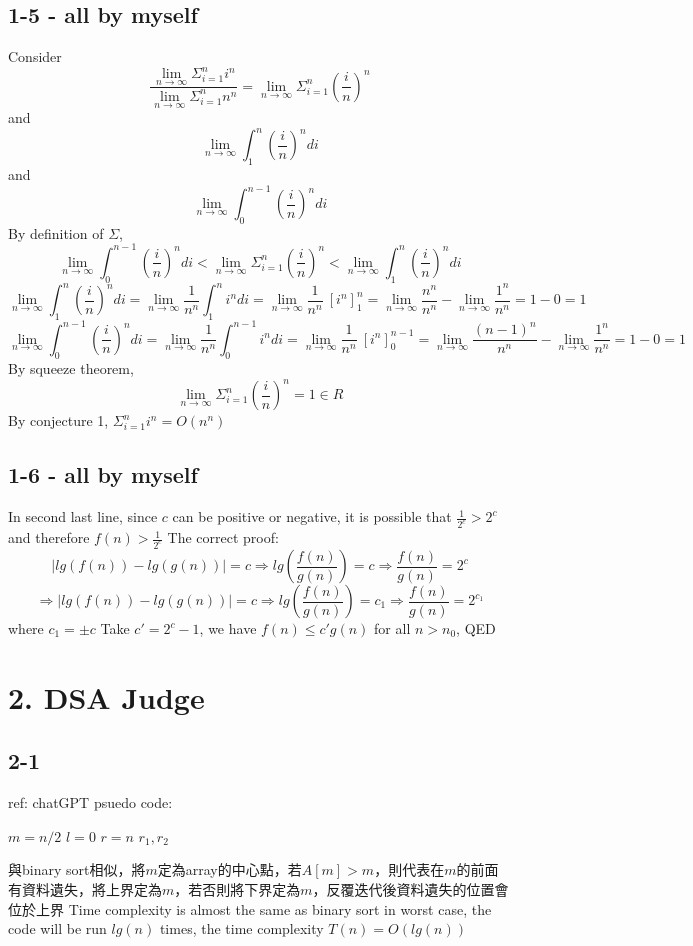 \documentclass[12pt]{article}
\begin{document}
\subsection*{1-5 - all by myself}
Consider
\[\frac{\lim_{n \to \infty}{\Sigma_{i = 1}^{n}i^n}}{\lim_{n \to \infty}{\Sigma_{i = 1}^{n}n^n}} = \lim_{n \to \infty}{\Sigma_{i = 1}^{n}(\frac{i}{n})^n}\]
and
\[\lim_{n \to \infty}{\int^n_1(\frac{i}{n})^n di}\]
and
\[\lim_{n \to \infty}{\int^{n - 1}_0(\frac{i}{n})^n di}\]
By definition of $\Sigma$,
\[\lim_{n \to \infty}{\int^{n - 1}_0(\frac{i}{n})^n di}<\lim_{n \to \infty}{\Sigma_{i = 1}^{n}(\frac{i}{n})^n}<\lim_{n \to \infty}{\int^n_1(\frac{i}{n})^n di}\]
\[\lim_{n \to \infty}{\int^n_1(\frac{i}{n})^n di} = \lim_{n \to \infty}{\frac{1}{n^n}\int^n_1 i^n di} = \lim_{n \to \infty}{\frac{1}{n^n}\ \left[i^n\right]^n_1 }=\lim_{n \to \infty}{\frac{n^n}{n^n}}-\lim_{n \to \infty}{\frac{1^n}{n^n}}=1-0=1\]
\[\lim_{n \to \infty}{\int^{n-1}_0(\frac{i}{n})^n di} = \lim_{n \to \infty}{\frac{1}{n^n}\int^{n-1}_0 i^n di} = \lim_{n \to \infty}{\frac{1}{n^n}\ \left[i^n\right]^{n-1}_0 }=\lim_{n \to \infty}{\frac{(n-1)^n}{n^n}}-\lim_{n \to \infty}{\frac{1^n}{n^n}}=1-0=1\]
By squeeze theorem,
\[\lim_{n \to \infty}{\Sigma_{i = 1}^{n}(\frac{i}{n})^n} = 1\in R\]
By conjecture 1, ${\Sigma_{i = 1}^{n}i^n} = O(n^n)$

\subsection*{1-6 - all by myself}
In second last line, since $c$ can be positive or negative, it is possible that $\frac{1}{2^c}>2^c$ and therefore $f(n)> \frac{1}{2^c}$\newline
The correct proof:
\[|lg(f(n))-lg(g(n))|=c\Rightarrow lg(\frac{f(n)}{g(n)}) = c \Rightarrow\frac{f(n)}{g(n)}=2^c\]
\[\Rightarrow |lg(f(n))-lg(g(n))|=c\Rightarrow lg(\frac{f(n)}{g(n)}) = c_1 \Rightarrow\frac{f(n)}{g(n)}=2^{c_1}\]
where $c_1 = \pm c$\newline
Take $c' = 2^c-1$, we have $f(n)\leq c'g(n)$ for all $n > n_0$, QED\newpage

\section*{2. DSA Judge}
\subsection*{2-1}
ref: chatGPT\newline
psuedo code:
\begin{algorithmic}
    \State $m= n/2$
    \State $l = 0$
    \State $r = n$
    \Else
    \EndIf
    \EndWhile
    \EndFor
    \State\Return $r_1, r_2$
    \EndProcedure
\end{algorithmic}
與binary sort相似，將$m$定為array的中心點，若$A[m]>m$，則代表在$m$的前面有資料遺失，將上界定為$m$，若否則將下界定為$m$，反覆迭代後資料遺失的位置會位於上界
Time complexity is almost the same as binary sort in worst case, the code will be run $lg(n)$ times, the time complexity $T(n) = O(lg(n))$
\newpage
\end{document}

